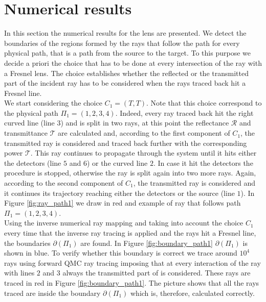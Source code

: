 \section{Numerical results}
In this section the numerical results for the lens are presented. We detect the boundaries of the regions formed by the rays that follow the path for every physical path, that is a path from the source to the target. To this purpose we decide a priori the choice that has to be done at every intersection of the ray with a Fresnel lens. The choice establishes whether the reflected or the transmitted part of the incident ray has to be considered when the rays traced back hit a Fresnel line.\\ \indent
We start considering the choice $C_1 = (T,T)$. Note that this choice correspond to the physical path $\Pi_1=(1,2,3,4)$.
Indeed, every ray traced back hit the right curved line (line $3$) and is split in two rays, at this point the reflectance $\mathcal{R}$ and transmittance $\mathcal{T}$ are calculated and, according to the first component of $C_1$, the transmitted ray is considered and traced back further with the corresponding power $\mathcal{T}$. This ray continues to propagate through the system until it hits either the detectors (line $5$ and $6$) or the curved line $2$.
In case it hit the detectors the procedure is stopped, otherwise the ray is split again into two more rays. Again, according to the second component of $C_1$, the transmitted ray is considered and it continues its trajectory reaching either the detectors or the source (line $1$). 
In Figure \ref{fig:ray_path1} we draw in red and example of ray that follows path $\Pi_1 = (1,2,3,4)$.\\ \indent 
Using the inverse numerical ray mapping and taking into account the choice $C_1$ every time that the inverse ray tracing is applied and the rays hit a Fresnel line, the boundaries $\partial$$(\Pi_1)$ are found. In Figure \ref{fig:boundary_path1} $\partial$$(\Pi_1)$ is shown in blue. To verify whether this boundary is correct we trace around $10^4$ rays using forward QMC ray tracing imposing that at every interaction of the ray with lines $2$ and $3$ always the transmitted part of is considered. These rays are traced in red in Figure \ref{fig:boundary_path1}. The picture shows that all the rays traced are inside the boundary $\partial$$(\Pi_1)$ which is, therefore, calculated correctly.
